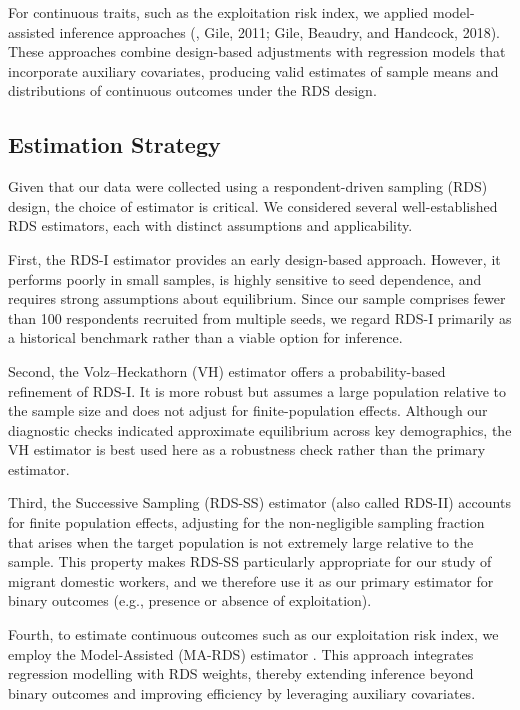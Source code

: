 \documentclass[
  12pt,
  letterpaper,
  DIV=11,
  numbers=noendperiod]{scrartcl}
\theoremstyle{plain}
\theoremstyle{definition}
\begin{document}
For continuous traits, such as the exploitation risk index, we applied
model-assisted inference approaches (\textcite{gile15-network}, Gile,
2011; Gile, Beaudry, and Handcock, 2018). These approaches combine
design-based adjustments with regression models that incorporate
auxiliary covariates, producing valid estimates of sample means and
distributions of continuous outcomes under the RDS design.

\subsection{Estimation Strategy}\label{estimation-strategy}

Given that our data were collected using a respondent-driven sampling
(RDS) design, the choice of estimator is critical. We considered several
well-established RDS estimators, each with distinct assumptions and
applicability.

First, the RDS-I estimator \textcite{salg04-samplin} provides an early
design-based approach. However, it performs poorly in small samples, is
highly sensitive to seed dependence, and requires strong assumptions
about equilibrium. Since our sample comprises fewer than 100 respondents
recruited from multiple seeds, we regard RDS-I primarily as a historical
benchmark rather than a viable option for inference.

Second, the Volz--Heckathorn (VH) estimator \textcite{volz08-probabi}
offers a probability-based refinement of RDS-I. It is more robust but
assumes a large population relative to the sample size and does not
adjust for finite-population effects. Although our diagnostic checks
indicated approximate equilibrium across key demographics, the VH
estimator is best used here as a robustness check rather than the
primary estimator.

Third, the Successive Sampling (RDS-SS) estimator (also called RDS-II)
\textcite{gile11-improve} accounts for finite population effects,
adjusting for the non-negligible sampling fraction that arises when the
target population is not extremely large relative to the sample. This
property makes RDS-SS particularly appropriate for our study of migrant
domestic workers, and we therefore use it as our primary estimator for
binary outcomes (e.g., presence or absence of exploitation).

Fourth, to estimate continuous outcomes such as our exploitation risk
index, we employ the Model-Assisted (MA-RDS) estimator
\textcite{gile15-network}. This approach integrates regression modelling
with RDS weights, thereby extending inference beyond binary outcomes and
improving efficiency by leveraging auxiliary covariates.
\end{document}
